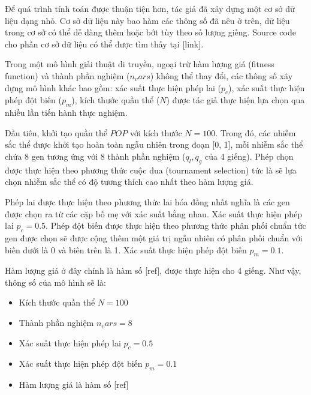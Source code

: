 \documentclass[12pt,a4paper]{report}
\begin{document}
Để quá trình tính toán được thuận tiện hơn, tác giả đã xây dựng một cơ sở dữ liệu dạng nhỏ. Cơ sở dữ liệu này bao hàm các thông số đã nêu ở trên, dữ liệu trong cơ sở có thể dễ dàng thêm hoặc bớt tùy theo số lượng giếng. Source code cho phần cơ sở dữ liệu có thể được tìm thấy tại [link].

Trong một mô hình giải thuật di truyền, ngoại trừ hàm lượng giá (fitness function) và thành phần nghiệm ($n_vars$) không thể thay đổi, các thông số xây dựng mô hình khác bao gồm: xác suất thực hiện phép lai ($p_c$), xác suất thực hiện phép đột biến ($p_m$), kích thước quần thể ($N$) được tác giả thực hiện lựa chọn qua nhiều lần tiến hành thực nghiệm.

Đầu tiên, khởi tạo quần thể $POP$ với kích thước $N = 100$. Trong đó, các nhiễm sắc thể được khởi tạo hoàn toàn ngẫu nhiên trong đoạn [0, 1], mỗi nhiễm sắc thể chứa 8 gen tương ứng với 8 thành phần nghiệm ($q_l, q_g$ của 4 giếng). Phép chọn được thực hiện theo phương thức cuộc đua (tournament selection) tức là sẽ lựa chọn nhiễm sắc thể có độ tương thích cao nhất theo hàm lượng giá.

Phép lai được thực hiện theo phương thức lai hóa đồng nhất nghĩa là các gen được chọn ra từ các cặp bố mẹ với xác suất bằng nhau. Xác suất thực hiện phép lai $p_c = 0.5$. Phép đột biến được thực hiện theo phương thức phân phối chuẩn tức gen được chọn sẽ được cộng thêm một giá trị ngẫu nhiên có phân phối chuẩn với biên dưới là 0 và biên trên là 1. Xác suất thực hiện phép đột biến $p_m = 0.1$.

Hàm lượng giá ở đây chính là hàm số [ref], được thực hiện cho 4 giếng. Như vậy, thông số của mô hình sẽ là:
	\begin{itemize}
		\item Kích thước quần thể $N = 100$
		\item Thành phần nghiệm $n_vars = 8$
		\item Xác suất thực hiện phép lai $p_c = 0.5$
		\item Xác suất thực hiện phép đột biến $p_m = 0.1$
		\item Hàm lượng giá là hàm số [ref]
	\end{itemize}
\end{document}

